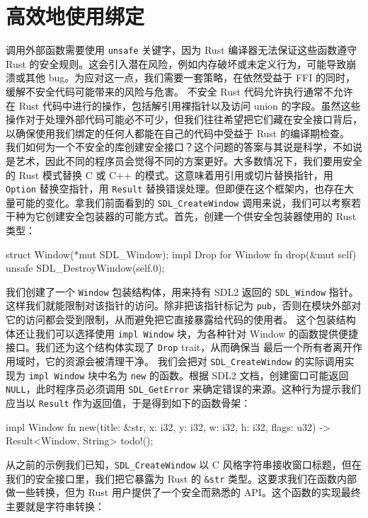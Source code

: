 \section{高效地使用绑定}
\label{idx:idx_063f42bf}
调用外部函数需要使用 \texttt{unsafe} 关键字，因为 Rust 编译器无法保证这些函数遵守 Rust 的安全规则。这会引入潜在风险，例如内存破坏或未定义行为，可能导致崩溃或其他 bug。为应对这一点，我们需要一套策略，在依然受益于 FFI 的同时，缓解不安全代码可能带来的风险与危害。
不安全 Rust 代码允许执行通常不允许在 Rust 代码中进行的操作，包括解引用裸指针以及访问 union 的字段。虽然这些操作对于处理外部代码可能必不可少，但我们往往希望把它们藏在安全接口背后，以确保使用我们绑定的任何人都能在自己的代码中受益于 Rust 的编译期检查。
我们如何为一个不安全的库创建安全接口？这个问题的答案与其说是科学，不如说是艺术，因此不同的程序员会觉得不同的方案更好。大多数情况下，我们要用安全的 Rust 模式替换 C 或 C++ 的模式。这意味着用引用或切片替换指针，用 \texttt{Option} 替换空指针，用 \texttt{Result} 替换错误处理。但即便在这个框架内，也存在大量可能的变化。拿我们前面看到的 \texttt{SDL\_\allowbreak{}CreateWindow} 调用来说，我们可以考察若干种为它创建安全包装器的可能方式。首先，创建一个供安全包装器使用的 Rust 类型：
\begin{codebox}[rust]
struct Window(*mut SDL_Window);
impl Drop for Window {
    fn drop(&mut self) {
        unsafe {
            SDL_DestroyWindow(self.0);
        }
    }
}
\end{codebox}
\label{idx:idx_6b6c1116}
我们创建了一个 \texttt{Window} 包装结构体，用来持有 SDL2 返回的 \texttt{SDL\_Window} 指针。这样我们就能限制对该指针的访问。除非把该指针标记为 \texttt{pub}，否则在模块外部对它的访问都会受到限制，从而避免把它直接暴露给代码的使用者。
这个包装结构体还让我们可以选择使用 \texttt{impl Window} 块，为各种针对 Window 的函数提供便捷接口。我们还为这个结构体实现了
\texttt{Drop} trait，从而确保当
最后一个所有者离开作用域时，它的资源会被清理干净。
我们会把对 \texttt{SDL\_\allowbreak{}CreateWindow} 的实际调用实现为 \texttt{impl Window} 块中名为 \texttt{new} 的函数。根据 SDL2 文档，创建窗口可能返回 \texttt{NULL}，此时程序员必须调用 \texttt{SDL\_\allowbreak{}GetError} 来确定错误的来源。这种行为提示我们应当以 \texttt{Result} 作为返回值，于是得到如下的函数骨架：
\begin{codebox}[rust]
impl Window {
    fn new(title: &str, x: i32, y: i32, w: i32, h: i32, flags: u32) ->
Result<Window, String> {
        todo!();
    }
}
\end{codebox}
从之前的示例我们已知，\texttt{SDL\_\allowbreak{}CreateWindow} 以 C 风格字符串接收窗口标题，但在我们的安全接口里，我们把它暴露为 Rust 的 \texttt{\&str} 类型。这要求我们在函数内部做一些转换，但为 Rust 用户提供了一个安全而熟悉的 API。这个函数的实现最终主要就是字符串转换：
